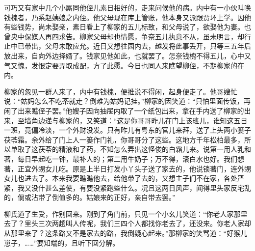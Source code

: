 \begin{parag}
    可巧又有家中几个小厮同他侄儿素日相好的，走来问候他的病。内中有一小伙叫唤钱槐者，乃系赵姨娘之内侄。他父母现在库上管账，他本身又派跟贾环上学。因他有些钱势，尚未娶亲，素日看上了柳家的五儿标致，和父母说了，欲娶他为妻。也曾央中保媒人再四求告。柳家父母却也情愿，争奈五儿执意不从，虽未明言，却行止中已带出，父母未敢应允。近日又想往园内去，越发将此事丢开，只等三五年后放出来，自向外边择婿了。钱家见他如此，也就罢了。怎奈钱槐不得五儿，心中又气又愧，发恨定要弄取成配，方了此愿。今日也同人来瞧望柳侄，不期柳家的在内。
\end{parag}


\begin{parag}
    柳家的忽见一群人来了，内中有钱槐，便推说不得闲，起身便走了。他哥嫂忙说：“姑妈怎么不吃茶就走？倒难为姑妈记挂。”柳家的因笑道：“只怕里面传饭，再闲了出来瞧侄子罢。”他嫂子因向抽屉内取了一个纸包出来，拿在手内送了柳家的出来，至墙角边递与柳家的，又笑道：“这是你哥哥昨儿在门上该班儿，谁知这五日一班，竟偏冷淡，一个外财没发。只有昨儿有粤东的官儿来拜，送了上头两小篓子茯苓霜。余外给了门上人一篓作门礼，你哥哥分了这些。这地方千年松柏最多，所以单取了这茯苓的精液和了药，不知怎么弄出这怪俊的白霜儿来。说第一用人乳和著，每日早起吃一钟，最补人的；第二用牛奶子；万不得，滚白水也好。我们想著，正宜外甥女儿吃。原是上半日打发小丫头子送了家去的，他说锁著门，连外甥女儿也进去了。本来我要瞧瞧他去，给他带了去的，又想主子们不在家，各处严紧，我又没什甚么差使，有要没紧跑些什么。况且这两日风声，闻得里头家反宅乱的，倘或沾带了倒值多的。姑娘来的正好，亲自带去罢。”
\end{parag}


\begin{parag}
    柳氏道了生受，作别回来。刚到了角门前，只见一个小幺儿笑道：“你老人家那里去了？里头三次两趟叫人传呢，我们三四个人都找你老去了，还没来。你老人家却从那里来了？这条路又不是家去的路，我倒疑心起来。”那柳家的笑骂道：“好猴儿崽子，……”要知端的，且听下回分解。
\end{parag}
